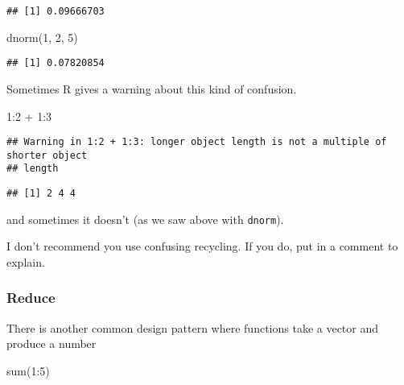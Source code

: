 \documentclass[
]{article}
\newenvironment{Shaded}{\begin{snugshade}}{\end{snugshade}}
\newcommand{\DecValTok}[1]{\textcolor[rgb]{0.00,0.00,0.81}{#1}}
\newcommand{\FunctionTok}[1]{\textcolor[rgb]{0.00,0.00,0.00}{#1}}
\newcommand{\NormalTok}[1]{#1}
\newcommand{\SpecialCharTok}[1]{\textcolor[rgb]{0.00,0.00,0.00}{#1}}
\begin{document}
\begin{verbatim}
## [1] 0.09666703
\end{verbatim}

\begin{Shaded}
\begin{Highlighting}[]
\FunctionTok{dnorm}\NormalTok{(}\DecValTok{1}\NormalTok{, }\DecValTok{2}\NormalTok{, }\DecValTok{5}\NormalTok{)}
\end{Highlighting}
\end{Shaded}

\begin{verbatim}
## [1] 0.07820854
\end{verbatim}

Sometimes R gives a warning about this kind of confusion.

\begin{Shaded}
\begin{Highlighting}[]
\DecValTok{1}\SpecialCharTok{:}\DecValTok{2} \SpecialCharTok{+} \DecValTok{1}\SpecialCharTok{:}\DecValTok{3}
\end{Highlighting}
\end{Shaded}

\begin{verbatim}
## Warning in 1:2 + 1:3: longer object length is not a multiple of shorter object
## length
\end{verbatim}

\begin{verbatim}
## [1] 2 4 4
\end{verbatim}

and sometimes it doesn't (as we saw above with \texttt{dnorm}).

I don't recommend you use confusing recycling. If you do, put in a
comment to explain.

\hypertarget{reduce}{%
\subsubsection{Reduce}\label{reduce}}

There is another common design pattern where functions take a vector and
produce a number

\begin{Shaded}
\begin{Highlighting}[]
\FunctionTok{sum}\NormalTok{(}\DecValTok{1}\SpecialCharTok{:}\DecValTok{5}\NormalTok{)}
\end{Highlighting}
\end{Shaded}
\end{document}
